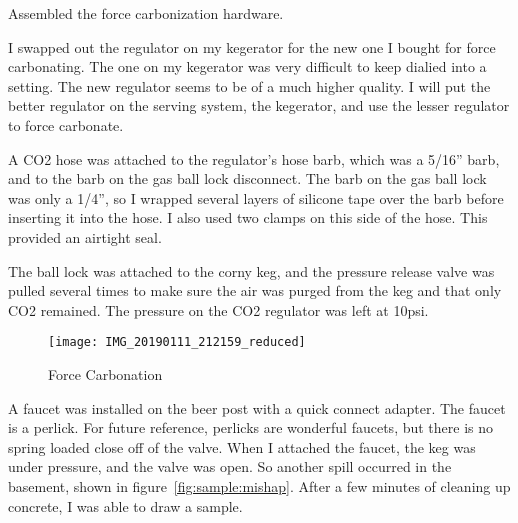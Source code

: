 \FloatBarrier{}
\clearpage
\def\todaysdate{20190111}
\newday{\todaysdate}\label{\todaysdate}

\FloatBarrier{}

\begin{my_itemize}
    \item Assembled the force carbonization hardware.
    \item I swapped out the regulator on my kegerator for the new one I bought for force carbonating.  The one on my kegerator was very difficult to keep dialied into a setting.  The new regulator seems to be of a much higher quality.  I will put the better regulator on the serving system, the kegerator, and use the lesser regulator to force carbonate.
    \item A CO2 hose was attached to the regulator's hose barb, which was a 5/16'' barb, and to the barb on the gas ball lock disconnect.  The barb on the gas ball lock was only a 1/4'', so I wrapped several layers of silicone tape over the barb before inserting it into the hose.  I also used two clamps on this side of the hose.  This provided an airtight seal.
    \item The ball lock was attached to the corny keg, and the pressure release valve was pulled several times to make sure the air was purged from the keg and that only CO2 remained.  The pressure on the CO2 regulator was left at 10psi.
\end{my_itemize}

\begin{figure}[H]
  \centering
  \texttt{[image: IMG\_20190111\_212159\_reduced]}
  \caption{Force Carbonation}\label{fig:forcecarbonation}
\end{figure}

\FloatBarrier{}
\clearpage

\def\todaysdate{20190111}
\newday{\todaysdate}\label{\todaysdate}

\FloatBarrier{}

A faucet was installed on the beer post with a quick connect adapter.  The faucet is a perlick.  For future reference, perlicks are wonderful faucets, but there is no spring loaded close off of the valve.  When I attached the faucet, the keg was under pressure, and the valve was open.  So another spill occurred in the basement, shown in figure~\ref{fig:sample:mishap}.  After a few minutes of cleaning up concrete, I was able to draw a sample.

